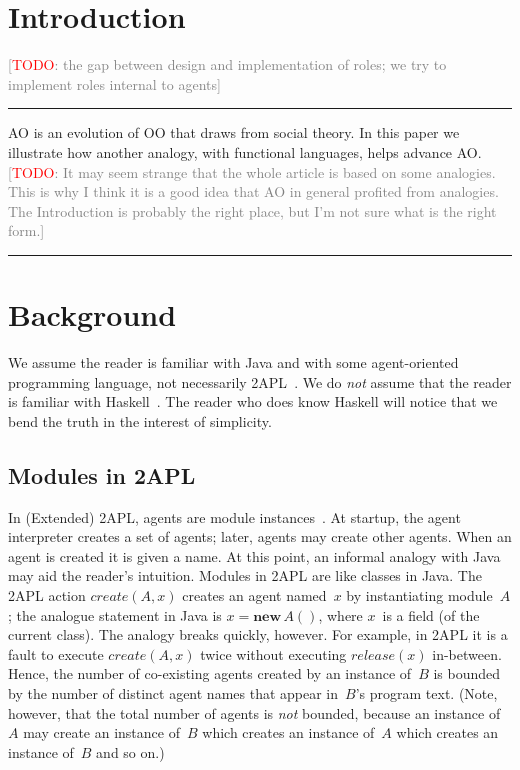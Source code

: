 \documentclass[conference,compsoc]{IEEEtran} %
\newcommand{\todo}[1]{{\small \textcolor{gray}{[\textcolor{red}{TODO}: #1]}}}
\newenvironment{notes}{\medskip\hrule\nobreak\smallskip\narrower}{\smallskip\hrule\medskip}
\begin{document}
\section{Introduction} %

\todo{the gap between design and implementation of roles; we try to implement roles internal to agents}

\begin{notes}
AO is an evolution of OO that draws from social theory. In this paper we
illustrate how another analogy, with functional languages, helps advance 
AO\null. \todo{It may seem strange that the whole article is based on some
analogies. This is why I think it is a good idea that AO in general
profited from analogies. The Introduction is probably the right place, but
I'm not sure what is the right form.}
\end{notes}

\section{Background} %

We assume the reader is familiar with Java and with some agent-oriented
programming language, not necessarily
2APL~\cite{DBLP:journals/aamas/Dastani08}. We do \emph{not} assume that the
reader is familiar with Haskell~\cite{web:haskell}. The reader who does
know Haskell will notice that we bend the truth in the interest of
simplicity.

\subsection{Modules in 2APL} %

In (Extended) 2APL, agents are module
instances~\cite{DBLP:conf/prima/DastaniMS08}. At startup, the agent
interpreter creates a set of agents; later, agents may create other agents.
When an agent is created it is given a name.  At this point, an informal
analogy with Java may aid the reader's intuition. Modules in 2APL are like
classes in Java. The 2APL action $\mathit{create}(A,x)$ creates an agent
named~$x$ by instantiating module~$A$; the analogue statement in Java is
$x=\mathbf{new}\,A()$, where $x$~is a field (of the current class).  The
analogy breaks quickly, however. For example, in 2APL it is a fault to
execute $\mathit{create}(A,x)$ twice without executing
$\mathit{release}(x)$ in-between. Hence, the number of co-existing agents
created by an instance of~$B$ is bounded by the number of distinct agent
names that appear in~$B$'s program text. (Note, however, that the total
number of agents is \emph{not} bounded, because an instance of~$A$ may
create an instance of~$B$ which creates an instance of~$A$ which creates an
instance of~$B$ and so on.)
\end{document}
